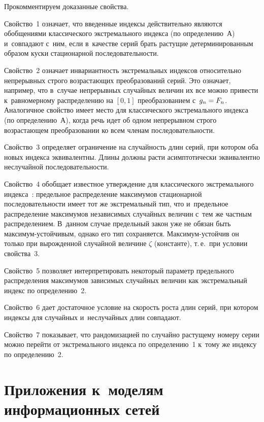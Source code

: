 \begin{multicols}{2}
\smallskip

Прокомментируем доказанные свойства.

Свойство~1 означает, что введенные индексы действительно являются обобщениями классического
экстремального индекса (по определению~А) и~совпадают с~ним, если в~качестве серий брать
растущие детерминированным образом куски стационарной последовательности.

Свойство~2 означает инвариантность экстремальных индексов относительно непрерывных строго
возрастающих преобразований серий. Это означает, например, что
в~случае непрерывных случайных
величин их все можно привести к~равномерному распределению на $[0,1]$ преобразованием
с~$g_n\hm=F_n$.
Аналогичное свойство имеет место для классического экстремального индекса
(по определению~А),
когда речь идет об одном непрерывном строго возрастающем преобразовании ко всем членам
последовательности.

Свойство~3 определяет ограничение на случайность длин серий, при котором оба новых индекса
эквивалентны. Длины должны расти асимптотически эквивалентно неслучайной 
по\-сле\-до\-ва\-тель\-ности.

Свойство~4 обобщает известное утверждение для классического
экстремального индекса~\cite[следствие 3.7.3]{LLR}: предельное
распределение максимумов стационарной последовательности имеет тот
же экстремальный тип, что и~предельное распределение максимумов
независимых случайных величин с~тем же частным распределением.
В~данном случае предельный закон уже не обязан быть
мак\-си\-мум-устой\-чи\-вым, однако его тип сохраняется. Максимум-устойчив
он только при вырожденной случайной величине $\zeta$ (константе),
т.\,е.\ при условии свойства~3.


Свойство~5 позволяет интерпретировать некоторый параметр
предельного распределения
максимумов зависимых случайных величин как экстремальный индекс по определению~2.



Свойство~6 дает достаточное условие на скорость роста длин серий, при котором индексы
для случайных и~неслучайных длин совпадают.

Свойство~7 показывает, что рандомизацией по случайно растущему номеру серии можно
перейти от экстремального индекса по определению~1 к~тому же индексу по определению~2.

\section{Приложения к~моделям информационных сетей}


\end{multicols}
